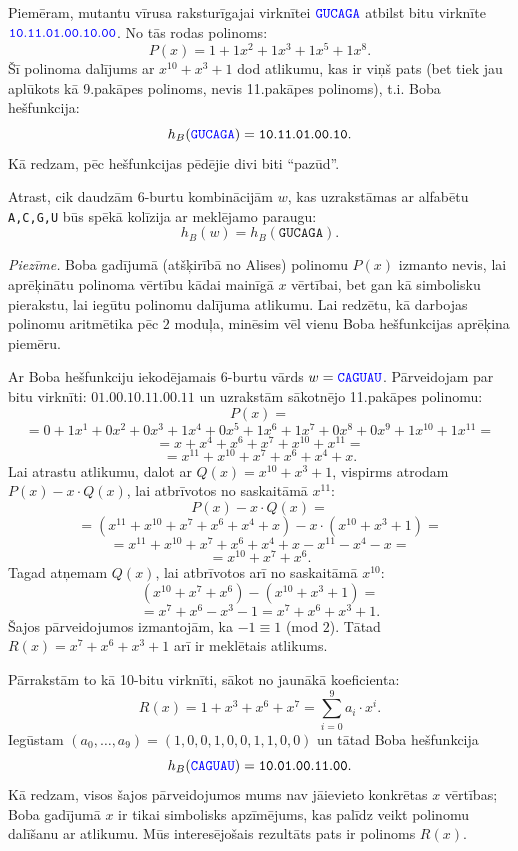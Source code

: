 \documentclass[a4paper,12pt]{article}
\begin{document}
Piemēram, mutantu vīrusa raksturīgajai virknītei
$\textcolor{blue}{\mathtt{GUCAGA}}$ atbilst bitu virknīte 
$\textcolor{blue}{\mathtt{10.11.01.00.10.00}}$. No tās rodas 
polinoms:
$$P(x) = 1 + 1x^2 + 1x^3 + 1x^5 + 1x^8.$$
Šī polinoma dalījums ar $x^{10} + x^3 + 1$ dod atlikumu, kas ir viņš pats
(bet tiek jau aplūkots kā 9.pakāpes polinoms, nevis 11.pakāpes polinoms), 
t.i. Boba hešfunkcija:
$$h_B(\textcolor{blue}{\mathtt{GUCAGA}}) = \mathtt{10.11.01.00.10}.$$
Kā redzam, pēc hešfunkcijas pēdējie divi biti ``pazūd''. 

Atrast, cik daudzām $6$-burtu kombinācijām $w$, kas uzrakstāmas ar 
alfabētu {\tt A,C,G,U} būs spēkā kolīzija ar meklējamo paraugu:
$$h_B(w) = h_B(\mathtt{GUCAGA}).$$

\vspace{5pt}
{\footnotesize
{\em Piezīme.} Boba gadījumā (atšķirībā no Alises) polinomu $P(x)$ izmanto nevis, lai aprēķinātu 
polinoma vērtību kādai mainīgā $x$ vērtībai, bet gan kā simbolisku pierakstu, 
lai iegūtu polinomu dalījuma atlikumu. Lai redzētu, kā darbojas polinomu aritmētika 
pēc $2$ moduļa, minēsim vēl vienu Boba hešfunkcijas aprēķina piemēru.

Ar Boba hešfunkciju iekodējamais $6$-burtu vārds $w = \textcolor{blue}{\mathtt{CAGUAU}}$. 
Pārveidojam par bitu virknīti: $\mathtt{01.00.10.11.00.11}$ un uzrakstām 
sākotnējo 11.pakāpes polinomu: 
$$P(x) = $$
$$=0 + 1x^1 + 0x^2 + 0x^3 + 1x^4 + 0x^5 + 1x^6 + 1x^7 + 0x^8 + 0x^9 + 1x^{10} + 1x^{11}=$$
$$ = x + x^4 + x^6 + x^7 + x^{10} + x^{11} = $$
$$ = x^{11} + x^{10} + x^7 + x^6 + x^4 + x.$$
Lai atrastu atlikumu, dalot ar $Q(x) = x^{10} + x^3 + 1$, vispirms atrodam 
$P(x) - x\cdot{}Q(x)$, lai atbrīvotos no saskaitāmā $x^{11}$:
$$P(x) - x\cdot{}Q(x) = $$
$$=\left( x^{11} + x^{10} + x^7 + x^6 + x^4 + x \right) - 
x \cdot \left( x^{10} + x^3 + 1 \right) = $$
$$=x^{11} + x^{10} + x^7 + x^6 + x^4 + x - x^{11} - x^4 - x = $$
$$=x^{10} + x^7 + x^6.$$
Tagad atņemam $Q(x)$, lai atbrīvotos arī no saskaitāmā $x^{10}$: 
$$\left( x^{10} + x^7 + x^6 \right) - \left( x^{10} + x^3 + 1 \right)=$$
$$= x^7 + x^6 - x^3 - 1 = x^7 + x^6 + x^3 + 1.$$
Šajos pārveidojumos izmantojām, ka $-1 \equiv 1$ (mod $2$). 
Tātad $R(x) = x^7 + x^6 + x^3 + 1$ arī ir meklētais atlikums. 

Pārrakstām to kā 10-bitu virknīti, sākot no jaunākā koeficienta:
$$R(x) = 1 + x^3 + x^6 + x^7 = \sum_{i=0}^{9} a_i \cdot x^i.$$
Iegūstam $(a_0,\ldots,a_{9}) = (1,0,0,1,0,0,1,1,0,0)$ un tātad
Boba hešfunkcija 
$$h_B(\textcolor{blue}{\mathtt{CAGUAU}}) = \mathtt{10.01.00.11.00}.$$
Kā redzam, visos šajos pārveidojumos mums nav jāievieto konkrētas $x$ vērtības; 
Boba gadījumā $x$ ir tikai simbolisks apzīmējums, kas palīdz 
veikt polinomu dalīšanu ar atlikumu. Mūs interesējošais rezultāts pats ir 
polinoms $R(x)$.
}
\end{document}
